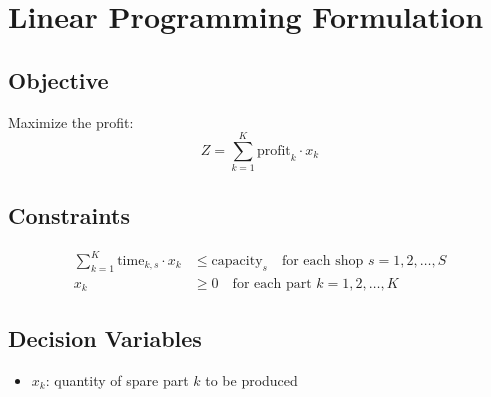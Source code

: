 \documentclass{article}
\begin{document}
\section*{Linear Programming Formulation}

\subsection*{Objective}
Maximize the profit:
\[
Z = \sum_{k=1}^{K} \text{profit}_k \cdot x_k
\]

\subsection*{Constraints}
\begin{align*}
\sum_{k=1}^{K} \text{time}_{k,s} \cdot x_k & \leq \text{capacity}_s \quad \text{for each shop } s = 1, 2, \ldots, S \\
x_k & \geq 0 \quad \text{for each part } k = 1, 2, \ldots, K
\end{align*}

\subsection*{Decision Variables}
\begin{itemize}
    \item \( x_k \): quantity of spare part \( k \) to be produced
\end{itemize}
\end{document}
